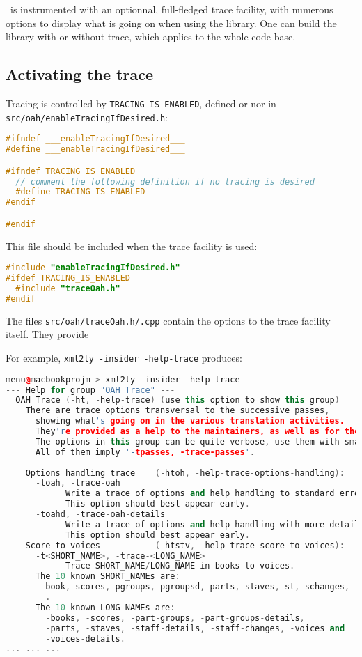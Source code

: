 \lib\ is instrumented with an optionnal, full-fledged trace facility, with numerous options to display what is going on when using the library.
One can build the library with or without trace, which applies to the whole code base.

\subsection{Activating the trace}

Tracing is controlled by {\tt TRACING_IS_ENABLED}, defined or nor in {\tt src/oah/enableTracingIfDesired.h}:

\begin{lstlisting}[language=C++]
#ifndef ___enableTracingIfDesired___
#define ___enableTracingIfDesired___

#ifndef TRACING_IS_ENABLED
  // comment the following definition if no tracing is desired
  #define TRACING_IS_ENABLED
#endif

#endif
\end{lstlisting}

This file should be included when the trace facility is used:
\begin{lstlisting}[language=C++]
#include "enableTracingIfDesired.h"
#ifdef TRACING_IS_ENABLED
  #include "traceOah.h"
#endif
\end{lstlisting}

The files {\tt src/oah/traceOah.h/.cpp} contain the options to the trace facility itself.
They provide 

For example, {\tt xml2ly -insider -help-trace} produces:
\begin{lstlisting}[language=C++]
menu@macbookprojm > xml2ly -insider -help-trace
--- Help for group "OAH Trace" ---
  OAH Trace (-ht, -help-trace) (use this option to show this group)
    There are trace options transversal to the successive passes,
      showing what's going on in the various translation activities.
      They're provided as a help to the maintainers, as well as for the curious.
      The options in this group can be quite verbose, use them with small input data!
      All of them imply '-tpasses, -trace-passes'.
  --------------------------
    Options handling trace    (-htoh, -help-trace-options-handling):
      -toah, -trace-oah
            Write a trace of options and help handling to standard error.
            This option should best appear early.
      -toahd, -trace-oah-details
            Write a trace of options and help handling with more details to standard error.
            This option should best appear early.
    Score to voices           (-htstv, -help-trace-score-to-voices):
      -t<SHORT_NAME>, -trace-<LONG_NAME>
            Trace SHORT_NAME/LONG_NAME in books to voices.
      The 10 known SHORT_NAMEs are:
        book, scores, pgroups, pgroupsd, parts, staves, st, schanges,
        .
      The 10 known LONG_NAMEs are:
        -books, -scores, -part-groups, -part-groups-details,
        -parts, -staves, -staff-details, -staff-changes, -voices and
        -voices-details.
... ... ...
\end{lstlisting}


